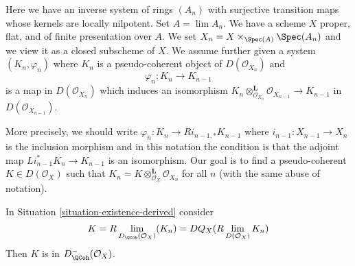 \begin{situation}
\label{situation-existence-derived}
Here we have an inverse system of rings $(A_n)$ with surjective transition
maps whose kernels are locally nilpotent. Set $A = \lim A_n$. We have a
scheme $X$ proper, flat, and of finite presentation over $A$.
We set $X_n = X \times_{\Spec(A)} \Spec(A_n)$ and we
view it as a closed subscheme of $X$. We assume further given a system
$(K_n, \varphi_n)$ where $K_n$ is a pseudo-coherent object of
$D(\mathcal{O}_{X_n})$ and
$$
\varphi_n : K_n \longrightarrow K_{n - 1}
$$
is a map in $D(\mathcal{O}_{X_n})$ which induces an isomorphism
$K_n \otimes_{\mathcal{O}_{X_n}}^\mathbf{L} \mathcal{O}_{X_{n - 1}}
\to K_{n - 1}$ in $D(\mathcal{O}_{X_{n - 1}})$.
\end{situation}

\noindent
More precisely, we should write
$\varphi_n : K_n \to Ri_{n - 1, *}K_{n - 1}$
where $i_{n - 1} : X_{n - 1} \to X_n$ is the inclusion morphism
and in this notation the condition is that the adjoint
map $Li_{n - 1}^*K_n \to K_{n - 1}$ is an isomorphism.
Our goal is to find a pseudo-coherent $K \in D(\mathcal{O}_X)$
such that $K_n = K \otimes_{\mathcal{O}_X}^\mathbf{L} \mathcal{O}_{X_n}$
for all $n$ (with the same abuse of notation).

\begin{lemma}
\label{lemma-compute-what-it-should-be-derived}
In Situation \ref{situation-existence-derived} consider
$$
K = R\lim_{D_\QCoh(\mathcal{O}_X)}(K_n) =
DQ_X(R\lim_{D(\mathcal{O}_X)} K_n)
$$
Then $K$ is in $D^-_{\QCoh}(\mathcal{O}_X)$.
\end{lemma}

